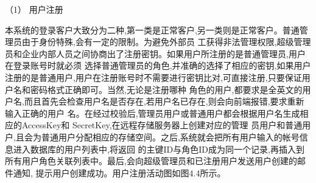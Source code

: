 （1） 用户注册


本系统的登录客户大致分为二种,第一类是正常客户,另一类则是正常客户。普通管理员由于身份特殊,会有一定的限制。为避免外部员
工获得非法管理权限,超级管理员和企业内部人员之间协商出了注册密钥。如果用户所注册的是普通管理员,用户在登录账号时就必须
选择普通管理员的角色,并准确的选择了相应的密钥,如果用户注册的是普通用户,用户在注册账号时不需要进行密钥比对,可直接注册,只要保证用户名和密码格式正确即可。当然,无论是注册哪种
角色的用户,都要求是全英文的用户名,而且首先会检查用户名是否存在,若用户名已存在,则会向前端报错,要求重新输入正确的用户
名。在经过校验后,管理员用户或普通用户都会根据用户名生成相应的AccessKey和 SecretKey,在远程存储服务器上创建对应的管理
员用户和普通用户,且会为普通用户分配相应的存储空间。之后,系统就会把所有用户输入的帐号信息进入数据库的用户列表中,将返回
的主键ID与角色ID成为同一个记录,再插入到所有用户角色关联列表中。最后,会向超级管理员和已注册用户发送用户创建的邮件通知,
提示用户创建成功。用户注册活动图如图4.4所示。

